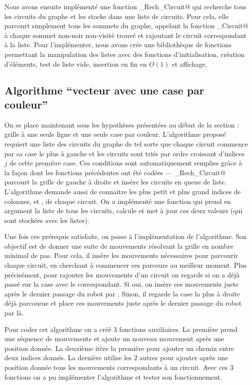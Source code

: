 \documentclass[a4paper,12pt]{article}
\numberwithin{equation}{section}
\begin{document}
Nous avons ensuite implémenté une fonction \verb@Graphe_Rech_Circuit@ qui recherche tous les circuits du graphe et les stocke dans une liste de circuits. Pour cela, elle parcourt simplement tous les sommets du graphe, appelant la fonction \verb@Rech_Circuit@ à chaque sommet non-noir non-visité trouvé et rajoutant le circuit correspondant à la liste. Pour l'implémenter, nous avons crée une bibliothèque de fonctions permettant la manipulation des listes \verb@Lcircuit@ avec des fonctions d'initialisation, création d'éléments, test de liste vide, insertion en fin en $O(1)$ et affichage.

\subsection{Algorithme ``vecteur avec une case par couleur''}
\label{SecAlgo}

On se place maintenant sous les hypothèses présentées au début de la section : grille à une seule ligne et une seule case par couleur. L'algorithme proposé requiert une liste des circuits du graphe de tel sorte que chaque circuit commence par sa case le plus à gauche et les circuits sont triés par ordre croissant d'indices $j$ de cette première case. Ces conditions sont automatiquement remplies grâce à la façon dont les fonctions précédentes ont été codées --- \verb@Graphe_Rech_Circuit@ parcourt la grille de gauche à droite et insère les circuits en queue de liste. L'algorithme demande aussi de connaitre les plus petit et plus grand indices de colonnes, \verb@jmin@ et \verb@jmax@, de chaque circuit. On a implémenté une fonction qui prend en argument la liste de tous les circuits, calcule et met à jour ces deux valeurs (qui sont stockées avec les listes). 

Une fois ces prérequis satisfaits, on passe à l’implémentation de l'algorithme. Son objectif est de donner une suite de mouvements résolvant la grille en nombre minimal de pas. Pour cela, il insère les mouvements nécessaires pour parcourir chaque circuit, en cherchant à commencer ces parcours au meilleur moment. Plus précisément, pour rajouter les mouvements d'un circuit on regarde si on a déjà passé sur la case avec le \verb@jmin@ correspondant. Si oui, on insère ces mouvements juste après le dernier passage du robot par \verb@jmin@. Sinon, il regarde la case la plus à droite déjà parcourue et place ces mouvements juste après le dernier passage du robot par là. 

Pour coder cet algorithme on a créé 3 fonctions auxiliaires. La première prend une séquence de mouvements et ajoute un nouveau mouvement après une position donnée. La deuxième itère la première pour ajouter un chemin entre deux indices donnés. La dernière utilise les 2 autres pour ajouter après une position donnée tous les mouvements correspondants à un circuit. Avec ces 3 fonctions on a pu implémenter l'algorithme et tester son fonctionnement.
\end{document}
